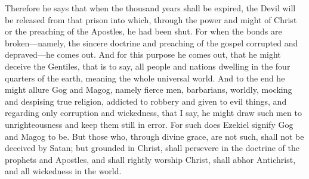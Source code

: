 Therefore he says that when the thousand years shall be expired, the Devil will be released from that prison into which, through the power and might of Christ or the preaching of the Apostles, he had been shut. For when the bonds are broken—namely, the sincere doctrine and preaching of the gospel corrupted and depraved—he comes out. And for this purpose he comes out, that he might deceive the Gentiles, that is to say, all people and nations dwelling in the four quarters of the earth, meaning the whole universal world. And to the end he might allure Gog and Magog, namely fierce men, barbarians, worldly, mocking and despising true religion, addicted to robbery and given to evil things, and regarding only corruption and wickedness, that I say, he might draw such men to unrighteousness and keep them still in error. For such does Ezekiel signify Gog and Magog to be. But those who, through divine grace, are not such, shall not be deceived by Satan; but grounded in Christ, shall persevere in the doctrine of the prophets and Apostles, and shall rightly worship Christ, shall abhor Antichrist, and all wickedness in the world.

